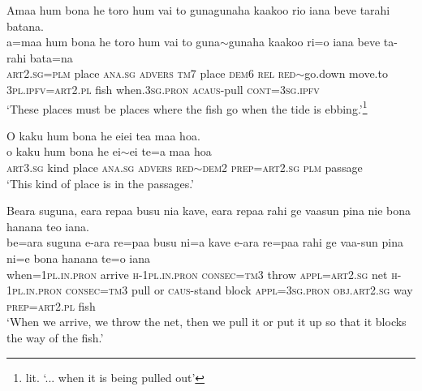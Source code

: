 \ea\label{ex:text24-5}
Amaa hum bona he toro hum vai to gunagunaha kaakoo rio iana beve tarahi batana.\\
\gll a=maa	hum	bona	he	toro	hum	vai	to	guna{$\sim$}gunaha	kaakoo	ri=o	iana	beve	ta-rahi	bata=na\\
     \textsc{art}2.\textsc{sg}=\textsc{plm}	place	\textsc{ana}.\textsc{sg}	\textsc{advers}	\textsc{tm}7	place	\textsc{dem}6	\textsc{rel}	\textsc{red}{$\sim$}go.down	move.to	3\textsc{pl}.\textsc{ipfv}=\textsc{art}2.\textsc{pl}	fish	when.3\textsc{sg}.\textsc{pron}	\textsc{acaus}-pull	\textsc{cont}=3\textsc{sg}.\textsc{ipfv}\\
\glt `These places must be places where the fish go when the tide is ebbing.'\footnote{lit. `... when it is being pulled out'}
\z

\ea\label{ex:text24-6}
O kaku hum bona he eiei tea maa hoa.\\
\gll o	kaku	hum	bona	he	ei{$\sim$}ei	te=a	maa	hoa\\
     \textsc{art}3.\textsc{sg}	kind	place	\textsc{ana}.\textsc{sg}	\textsc{advers}	\textsc{red}{$\sim$}\textsc{dem}2	\textsc{prep}=\textsc{art}2.\textsc{sg}	\textsc{plm}	passage\\
\glt `This kind of place is in the passages.'
\z

\ea\label{ex:text24-7}
Beara suguna, eara repaa busu nia kave, eara repaa rahi ge vaasun pina nie bona hanana teo iana.\\
\gll be=ara	suguna	e-ara	re=paa	busu	ni=a	kave	e-ara	re=paa	rahi	ge	vaa-sun	pina	ni=e	bona	hanana	te=o	iana\\
     when=1\textsc{pl}.\textsc{in}.\textsc{pron}	arrive	\textsc{h}-1\textsc{pl}.\textsc{in}.\textsc{pron}	\textsc{consec}=\textsc{tm}3	throw	\textsc{appl}=\textsc{art}2.\textsc{sg}	net	\textsc{h}-1\textsc{pl}.\textsc{in}.\textsc{pron}	\textsc{consec}=\textsc{tm}3	pull	or	\textsc{caus}-stand	block	\textsc{appl}=3\textsc{sg}.\textsc{pron}	\textsc{obj}.\textsc{art}2.\textsc{sg}	way	\textsc{prep}=\textsc{art}2.\textsc{pl}	fish\\
\glt `When we arrive, we throw the net, then we pull it or put it up so that it blocks the way of the fish.'
\z

